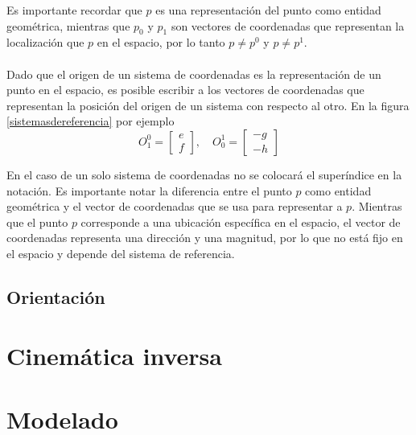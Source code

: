 Es importante recordar que $p$ es una representación del punto como entidad geométrica, mientras que $p_{0}$ y $p_{1}$ son vectores de coordenadas que representan la localización que $p$ en el espacio, por lo tanto $p\neq p^{0}$ y $p\neq p^{1}$.\\\\
Dado que el origen de un sistema de coordenadas es la representación de un punto en el espacio, es posible escribir a los vectores de coordenadas que representan la posición del origen de un sistema con respecto al otro. En la figura \ref{sistemasdereferencia} por ejemplo
\[
O_1^0 = 
\begin{bmatrix}
e\\
f
\end{bmatrix}
,\quad
O_0^1 = 
\begin{bmatrix}
-g\\
-h
\end{bmatrix}
\]

En el caso de un solo sistema de coordenadas no se colocará el superíndice en la notación. Es importante notar la diferencia entre el punto $p$ como entidad geométrica y el vector de coordenadas que se usa para representar a $p$. Mientras que el punto $p$ corresponde a una ubicación específica en el espacio, el vector de coordenadas representa una dirección y una magnitud, por lo que no está fijo en el espacio y depende del sistema de referencia.


\subsection{Orientación}



\section{Cinemática inversa}

\section{Modelado}

\begin{lstlisting}[frame=single]
    % Declaracion de las variables simbolicas
\end{lstlisting}
